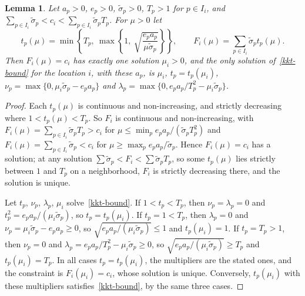 \documentclass[11pt]{article}
\theoremstyle{plain}
\newtheorem{lemma}[theorem]{Lemma}
\theoremstyle{remark}
\numberwithin{equation}{section}
\begin{document}
\begin{lemma}\label{frozen-bound}
Let $a_p>0$, $e_p>0$, $\widetilde\sigma_p>0$, $T_p>1$ for $p\in I_i$, and
$\sum_{p\in I_i}\widetilde\sigma_p<c_i<\sum_{p\in I_i}\widetilde\sigma_pT_p$. For
$\mu>0$ let
\begin{equation}\label{t-of-mu-bound}
t_p(\mu)=\min\left\{T_p,\ \max\left\{1,\ \sqrt{\frac{e_pa_p}{\mu\widetilde\sigma_p}}\right\}\right\},
\qquad F_i(\mu)=\sum_{p\in I_i}\widetilde\sigma_pt_p(\mu).
\end{equation}
Then $F_i(\mu)=c_i$ has exactly one solution $\mu_i>0$, and the only solution
of~\eqref{kkt-bound} for the location $i$, with these $a_p$, is $\mu_i$,
$t_p=t_p(\mu_i)$, $\nu_p=\max\{0,\mu_i\widetilde\sigma_p-e_pa_p\}$ and
$\lambda_p=\max\{0,e_pa_p/T_p^2-\mu_i\widetilde\sigma_p\}$.
\end{lemma}
\begin{proof}
Each $t_p(\mu)$ is continuous and non-increasing, and strictly decreasing where
$1<t_p(\mu)<T_p$. So $F_i$ is continuous and non-increasing, with
$F_i(\mu)=\sum_{p\in I_i}\widetilde\sigma_pT_p>c_i$ for
$\mu\le\min_pe_pa_p/(\widetilde\sigma_pT_p^2)$ and
$F_i(\mu)=\sum_{p\in I_i}\widetilde\sigma_p<c_i$ for
$\mu\ge\max_pe_pa_p/\widetilde\sigma_p$. Hence $F_i(\mu)=c_i$ has a solution; at
any solution $\sum\widetilde\sigma_p<F_i<\sum\widetilde\sigma_pT_p$, so some
$t_p(\mu)$ lies strictly between $1$ and $T_p$ on a neighborhood, $F_i$ is
strictly decreasing there, and the solution is unique.

Let $t_p$, $\nu_p$, $\lambda_p$, $\mu_i$ solve~\eqref{kkt-bound}. If $1<t_p<T_p$,
then $\nu_p=\lambda_p=0$ and $t_p^2=e_pa_p/(\mu_i\widetilde\sigma_p)$, so
$t_p=t_p(\mu_i)$. If $t_p=1<T_p$, then $\lambda_p=0$ and
$\nu_p=\mu_i\widetilde\sigma_p-e_pa_p\ge0$, so
$\sqrt{e_pa_p/(\mu_i\widetilde\sigma_p)}\le1$ and $t_p(\mu_i)=1$. If $t_p=T_p>1$,
then $\nu_p=0$ and $\lambda_p=e_pa_p/T_p^2-\mu_i\widetilde\sigma_p\ge0$, so
$\sqrt{e_pa_p/(\mu_i\widetilde\sigma_p)}\ge T_p$ and $t_p(\mu_i)=T_p$. In all cases
$t_p=t_p(\mu_i)$, the multipliers are the stated ones, and the constraint is
$F_i(\mu_i)=c_i$, whose solution is unique. Conversely, $t_p(\mu_i)$ with these
multipliers satisfies~\eqref{kkt-bound}, by the same three cases.
\end{proof}
\end{document}
